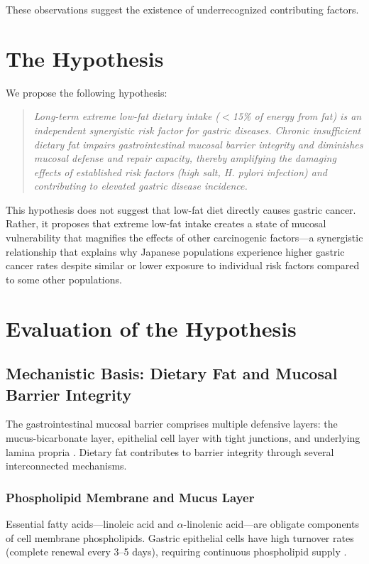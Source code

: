 \documentclass[review]{elsarticle}
\begin{document}
These observations suggest the existence of underrecognized contributing factors.

\section{The Hypothesis}

We propose the following hypothesis:

\begin{quote}
\textit{Long-term extreme low-fat dietary intake ($<$15\% of energy from fat) is an independent synergistic risk factor for gastric diseases. Chronic insufficient dietary fat impairs gastrointestinal mucosal barrier integrity and diminishes mucosal defense and repair capacity, thereby amplifying the damaging effects of established risk factors (high salt, \textit{H. pylori} infection) and contributing to elevated gastric disease incidence.}
\end{quote}

This hypothesis does not suggest that low-fat diet directly causes gastric cancer. Rather, it proposes that extreme low-fat intake creates a state of mucosal vulnerability that magnifies the effects of other carcinogenic factors---a synergistic relationship that explains why Japanese populations experience higher gastric cancer rates despite similar or lower exposure to individual risk factors compared to some other populations.

\section{Evaluation of the Hypothesis}

\subsection{Mechanistic Basis: Dietary Fat and Mucosal Barrier Integrity}

The gastrointestinal mucosal barrier comprises multiple defensive layers: the mucus-bicarbonate layer, epithelial cell layer with tight junctions, and underlying lamina propria \cite{turner2009}. Dietary fat contributes to barrier integrity through several interconnected mechanisms.

\subsubsection{Phospholipid Membrane and Mucus Layer}

Essential fatty acids---linoleic acid and $\alpha$-linolenic acid---are obligate components of cell membrane phospholipids. Gastric epithelial cells have high turnover rates (complete renewal every 3--5 days), requiring continuous phospholipid supply \cite{papadia2012}.
\end{document}
